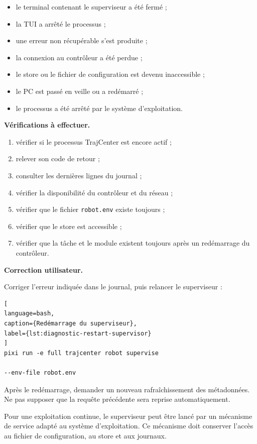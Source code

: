 \documentclass{rapportENSAM}
\begin{document}
\begin{itemize}
\item le terminal contenant le superviseur a été fermé ;
\item la TUI a arrêté le processus ;
\item une erreur non récupérable s'est produite ;
\item la connexion au contrôleur a été perdue ;
\item le store ou le fichier de configuration est devenu inaccessible ;
\item le PC est passé en veille ou a redémarré ;
\item le processus a été arrêté par le système d'exploitation.
\end{itemize}

\textbf{Vérifications à effectuer.}

\begin{enumerate}
\item vérifier si le processus TrajCenter est encore actif ;
\item relever son code de retour ;
\item consulter les dernières lignes du journal ;
\item vérifier la disponibilité du contrôleur et du réseau ;
\item vérifier que le fichier \texttt{robot.env} existe toujours ;
\item vérifier que le store est accessible ;
\item vérifier que la tâche et le module existent toujours après un
redémarrage du contrôleur.
\end{enumerate}

\textbf{Correction utilisateur.}

Corriger l'erreur indiquée dans le journal, puis relancer le superviseur :

\begin{lstlisting}[
language=bash,
caption={Redémarrage du superviseur},
label={lst:diagnostic-restart-supervisor}
]
pixi run -e full trajcenter robot supervise 

--env-file robot.env
\end{lstlisting}

Après le redémarrage, demander un nouveau rafraîchissement des métadonnées.
Ne pas supposer que la requête précédente sera reprise automatiquement.

Pour une exploitation continue, le superviseur peut être lancé par un
mécanisme de service adapté au système d'exploitation. Ce mécanisme doit
conserver l'accès au fichier de configuration, au store et aux journaux.
\end{document}
